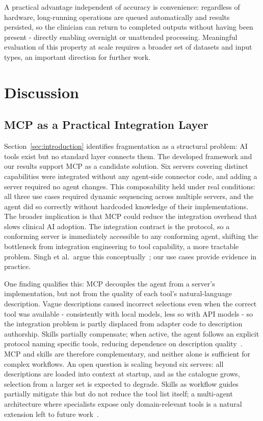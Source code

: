 \documentclass[1p,12pt]{elsarticle}
\begin{document}
A practical advantage independent of accuracy is convenience: regardless of hardware, long-running operations are queued automatically and results persisted, so the clinician can return to completed outputs without having been present - directly enabling overnight or unattended processing. Meaningful evaluation of this property at scale requires a broader set of datasets and input types, an important direction for further work.

\section{Discussion}

\subsection{MCP as a Practical Integration Layer}
Section~\ref{sec:introduction} identifies fragmentation as a structural problem: AI tools exist but no standard layer connects them. The developed framework and our results support MCP as a candidate solution. Six servers covering distinct capabilities were integrated without any agent-side connector code, and adding a server required no agent changes. This composability held under real conditions: all three use cases required dynamic sequencing across multiple servers, and the agent did so correctly without hardcoded knowledge of their implementations. The broader implication is that MCP could reduce the integration overhead that slows clinical AI adoption. The integration contract is the protocol, so a conforming server is immediately accessible to any conforming agent, shifting the bottleneck from integration engineering to tool capability, a more tractable problem. Singh et al.\ argue this conceptually~\cite{mcp-aditi}; our use cases provide evidence in practice.

One finding qualifies this: MCP decouples the agent from a server's implementation, but not from the quality of each tool's natural-language description. Vague descriptions caused incorrect selections even when the correct tool was available - consistently with local models, less so with API models - so the integration problem is partly displaced from adapter code to description authorship. Skills partially compensate; when active, the agent follows an explicit protocol naming specific tools, reducing dependence on description quality~\cite{agentskillslargelanguage}. MCP and skills are therefore complementary, and neither alone is sufficient for complex workflows. An open question is scaling beyond six servers: all descriptions are loaded into context at startup, and as the catalogue grows, selection from a larger set is expected to degrade. Skills as workflow guides partially mitigate this but do not reduce the tool list itself; a multi-agent architecture where specialists expose only domain-relevant tools is a natural extension left to future work~\cite{klang2026orchestrated}.
\end{document}
